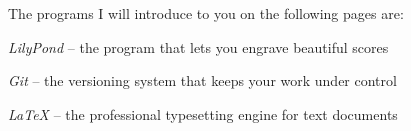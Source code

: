 \documentclass[../../LilyPond-Tutorials]{subfiles}
\begin{document}
The programs I will introduce to you on the following pages are:
\begin{itemize*}
\item \emph{LilyPond} -- the program that lets you engrave beautiful scores
\item \emph{Git} -- the versioning system that keeps your work under control
\item \emph{\LaTeX} -- the professional typesetting engine for text documents
\end{itemize*}
\end{document}
